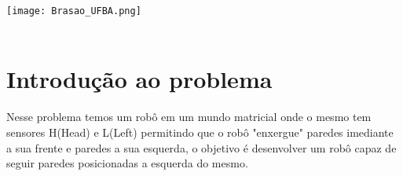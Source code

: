 \documentclass[
	12pt,				%
	openright,			%
	oneside,			%
	a4paper,			%
	chapter=TITLE,		%
	section=TITLE,		%
	english,			%
	brazil				%
	]{abntex2}
\begin{document}
\frenchspacing

\pretextual

\renewcommand{\imprimircapa}{
 \begin{capa}
  \center
  \texttt{[image: Brasao\_UFBA.png]}  \\
  {\bfseries\Large\MakeUppercase\imprimirinstituicao}
   \\
   \vfill
 {\bfseries\large\MakeUppercase\imprimirautor}
 \vfill
 {\bfseries\Large\MakeUppercase\imprimirtitulo}
 \vfill
 {\large\imprimirlocal}
 \par
 {\large\imprimirdata}
 \vspace*{1cm}
 \end{capa}
 }
\imprimircapa

\tableofcontents*
\cleardoublepage



\textual  %

\pagestyle{simple}
\section{Introdução ao problema}
Nesse problema temos um robô em um mundo matricial onde o mesmo tem sensores H(Head) e L(Left) permitindo que o robô "enxergue" paredes imediante a sua frente e paredes a sua esquerda, o objetivo é desenvolver um robô capaz de seguir paredes posicionadas a esquerda do mesmo.
\end{document}
